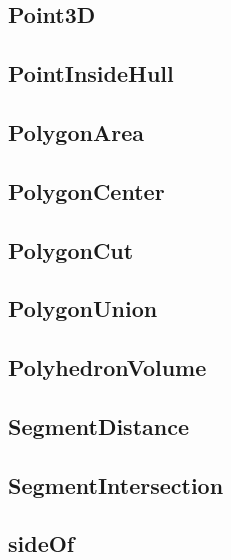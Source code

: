 \subsection{Point3D}
\raggedbottom
\hrulefill
\subsection{PointInsideHull}
\raggedbottom
\hrulefill
\subsection{PolygonArea}
\raggedbottom
\hrulefill
\subsection{PolygonCenter}
\raggedbottom
\hrulefill
\subsection{PolygonCut}
\raggedbottom
\hrulefill
\subsection{PolygonUnion}
\raggedbottom
\hrulefill
\subsection{PolyhedronVolume}
\raggedbottom
\hrulefill
\subsection{SegmentDistance}
\raggedbottom
\hrulefill
\subsection{SegmentIntersection}
\raggedbottom
\hrulefill
\subsection{sideOf}
\raggedbottom
\hrulefill
